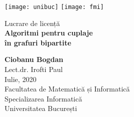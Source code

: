 \begin{titlepage}
  \vspace{1 in}
  \begin{center}
    \texttt{[image: unibuc]}
    \hfill
    \texttt{[image: fmi]}

    \Large
    Lucrare de licență \\

    \huge
    \textbf{Algoritmi pentru cuplaje \\ în grafuri bipartite} \\
    \vspace{0.8 in}

    \Large
    \textbf{Ciobanu Bogdan} \\
    Lect.dr. Irofti Paul \\

    \vspace*{\fill}
    Iulie, 2020 \\
    Facultatea de Matematică și Informatică\\
    Specializarea Informatică \\
    Universitatea București \\

  \end{center}
\end{titlepage}
